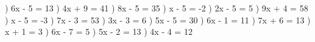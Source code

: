 \documentclass{article}%
\begin{document}
) 6x - 5 = 13%
\newline%
\newline%
) 4x + 9 = 41%
\newline%
\newline%
) 8x - 5 = 35%
\newline%
\newline%
) x - 5 = -2%
\newline%
\newline%
) 2x - 5 = 5%
\newline%
\newline%
) 9x + 4 = 58%
\newline%
\newline%
) x - 5 = -3%
\newline%
\newline%
) 7x - 3 = 53%
\newline%
\newline%
) 3x - 3 = 6%
\newline%
\newline%
) 5x - 5 = 30%
\newline%
\newline%
) 6x - 1 = 11%
\newline%
\newline%
) 7x + 6 = 13%
\newline%
\newline%
) x + 1 = 3%
\newline%
\newline%
) 6x - 7 = 5%
\newline%
\newline%
) 5x - 2 = 13%
\newline%
\newline%
) 4x - 4 = 12%
\newline%
\end{document}
